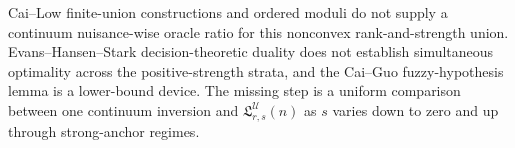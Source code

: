 Cai--Low finite-union constructions and ordered moduli do not supply a continuum nuisance-wise oracle ratio for this nonconvex rank-and-strength union.  Evans--Hansen--Stark decision-theoretic duality does not establish simultaneous optimality across the positive-strength strata, and the Cai--Guo fuzzy-hypothesis lemma is a lower-bound device.  The missing step is a uniform comparison between one continuum inversion and \(\mathfrak L_{r,s}^{\mathcal U}(n)\) as \(s\) varies down to zero and up through strong-anchor regimes.